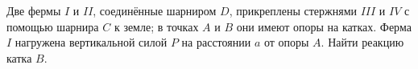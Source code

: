 Две фермы $I$ и $II$, соединённые шарниром $D$, прикреплены стержнями
$III$ и $IV$ с помощью шарнира $C$ к земле;
в точках $A$ и $B$ они имеют опоры на катках.
Ферма $I$ нагружена вертикальной силой $P$ на расстоянии $a$ от опоры $A$.
Найти реакцию катка $B$.
